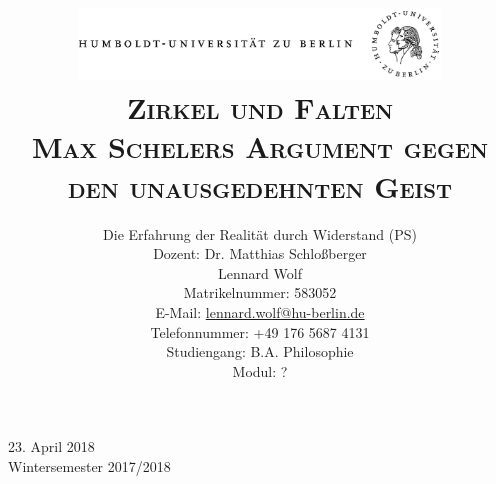 \documentclass[a4paper, 12pt]{article}
\date{\vspace{-3ex}}
\begin{document}
\title{\vspace{5ex}
	\includegraphics*[bb=0 0 720 200, width=0.72\textwidth]{ErstesSem/images/hu_logo.png}\\
	\vspace{30pt}
	\scshape\LARGE{Zirkel und Falten
}\\\vspace{5pt}\Large{Max Schelers Argument gegen den unausgedehnten Geist}\\\vspace{20pt}}
	


\author{Die Erfahrung der Realität durch Widerstand (PS)\\
	\vspace{7pt}
          Dozent: Dr. Matthias Schloßberger\\\vspace{4pt}Lennard Wolf\\
        \small{Matrikelnummer: 583052}\\
        \small{E-Mail: \href{mailto:lennard.wolf@hu-berlin.de}{lennard.wolf@hu-berlin.de}}\\
        \small{Telefonnummer: +49 176 5687 4131}\\
        \small{Studiengang: B.A. Philosophie}\\
        \small{Modul: ?}}

\maketitle

\vspace{\fill}

\begin{minipage}[]{0.92\textwidth}
    \centering
    \onehalfspacing
    \large   
    23. April 2018\\
    Wintersemester 2017/2018

    \vspace{-20mm} 
\end{minipage}%
\thispagestyle{empty}
\newpage
\setcounter{page}{1}
\end{document}
